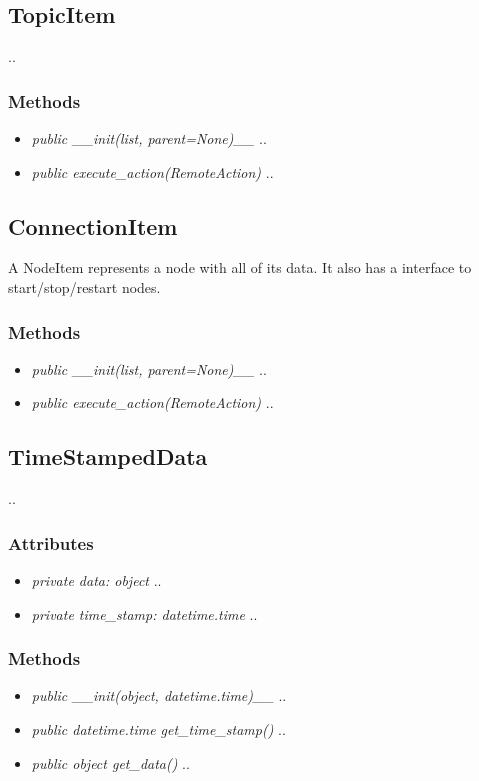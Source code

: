 \subsection{TopicItem}
..
\subsubsection{Methods}
\begin{itemize}
  \item \textit{public \_\_init(list, parent=None)\_\_}
  ..
  \item \textit{public execute\_action(RemoteAction)}
  ..
\end{itemize}

\subsection{ConnectionItem}
 A NodeItem represents a node with all of its data. It also has a interface to start/stop/restart nodes.
\subsubsection{Methods}
\begin{itemize}
  \item \textit{public \_\_init(list, parent=None)\_\_}
  ..
  \item \textit{public execute\_action(RemoteAction)}
  ..
\end{itemize}

\subsection{TimeStampedData}
..
\subsubsection{Attributes}
\begin{itemize}
  \item \textit{private data: object}
  ..
  \item \textit{private time\_stamp: datetime.time}
  ..
\end{itemize}
\subsubsection{Methods}
\begin{itemize}
  \item \textit{public \_\_init(object, datetime.time)\_\_}
  ..
  \item \textit{public datetime.time get\_time\_stamp()}
  ..
  \item \textit{public object get\_data()}
  ..
\end{itemize}

